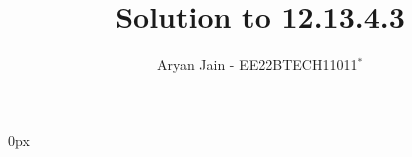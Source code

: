 \documentclass[journal,12pt,onecolumn]{IEEEtran}
\theoremstyle{remark}
\begin{document}
\parindent 0px




\vspace{3cm}

\title{
Solution to 12.13.4.3
}
\author{ Aryan Jain - EE22BTECH11011$^{*}$%
}	


%
%
%

% 
%



% 
\end{document}
